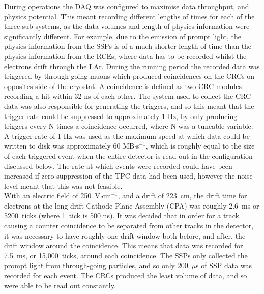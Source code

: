 During operations the DAQ was configured to maximise data throughput, and physics potential. This meant recording different lengths of times for each of the three sub-systems, as the data volumes and length of physics information were significantly different. For example, due to the emission of prompt light, the physics information from the SSPs is of a much shorter length of time than the physics information from the RCEs, where data has to be recorded whilst the electrons drift through the LAr. During the running period the recorded data was triggered by through-going muons which produced coincidences on the CRCs on opposites side of the cryostat. A coincidence is defined as two CRC modules recording a hit within 32 ns of each other. The system used to collect the CRC data was also responsible for generating the triggers, and so this meant that the trigger rate could be suppressed to approximately 1 Hz, by only producing triggers every N times a coincidence occurred, where N was a tuneable variable. A trigger rate of 1 Hz was used as the maximum speed at which data could be written to disk was approximately 60 MB$\cdot$s$^{-1}$, which is roughly equal to the size of each triggered event when the entire detector is read-out in the configuration discussed below. The rate at which events were recorded could have been increased if zero-suppression of the TPC data had been used, however the noise level meant that this was not feasible. \\ 

With an electric field of 250~V$\cdot$cm$^{-1}$, and a drift of 223~cm, the drift time for electrons at the long drift Cathode Plane Assembly (CPA) was roughly 2.6~ms or 5200~ticks (where 1~tick is 500 ns). It was decided that in order for a track causing a counter coincidence to be separated from other tracks in the detector, it was necessary to have roughly one drift window both before, and after, the drift window around the coincidence. This means that data was recorded for 7.5~ms, or 15,000~ticks, around each coincidence. The SSPs only collected the prompt light from through-going particles, and so only 200~$\mu$s of SSP data was recorded for each event. The CRCs produced the least volume of data, and so were able to be read out constantly. \\

